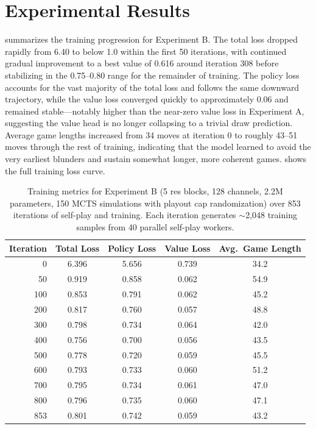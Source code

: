 \documentclass{article}
\begin{document}
\section{Experimental Results}
\label{sec:results}

 summarizes the training progression for Experiment B. The total loss dropped rapidly from 6.40 to below 1.0 within the first 50 iterations, with continued gradual improvement to a best value of 0.616 around iteration 308 before stabilizing in the 0.75--0.80 range for the remainder of training. The policy loss accounts for the vast majority of the total loss and follows the same downward trajectory, while the value loss converged quickly to approximately 0.06 and remained stable---notably higher than the near-zero value loss in Experiment A, suggesting the value head is no longer collapsing to a trivial draw prediction. Average game lengths increased from 34 moves at iteration 0 to roughly 43--51 moves through the rest of training, indicating that the model learned to avoid the very earliest blunders and sustain somewhat longer, more coherent games.  shows the full training loss curve.

\begin{table}[h]
\centering
\caption{Training metrics for Experiment B (5 res blocks, 128 channels, 2.2M parameters, 150 MCTS simulations with playout cap randomization) over 853 iterations of self-play and training. Each iteration generates $\sim$2,048 training samples from 40 parallel self-play workers.}
\label{tab:expb}
\begin{tabular}{@{}rcccc@{}}
\toprule
Iteration & Total Loss & Policy Loss & Value Loss & Avg.\ Game Length \\
\midrule
0   & 6.396 & 5.656 & 0.739 & 34.2 \\
50  & 0.919 & 0.858 & 0.062 & 54.9 \\
100 & 0.853 & 0.791 & 0.062 & 45.2 \\
200 & 0.817 & 0.760 & 0.057 & 48.8 \\
300 & 0.798 & 0.734 & 0.064 & 42.0 \\
400 & 0.756 & 0.700 & 0.056 & 43.5 \\
500 & 0.778 & 0.720 & 0.059 & 45.5 \\
600 & 0.793 & 0.733 & 0.060 & 51.2 \\
700 & 0.795 & 0.734 & 0.061 & 47.0 \\
800 & 0.796 & 0.735 & 0.060 & 47.1 \\
853 & 0.801 & 0.742 & 0.059 & 43.2 \\
\bottomrule
\end{tabular}
\end{table}
\end{document}
